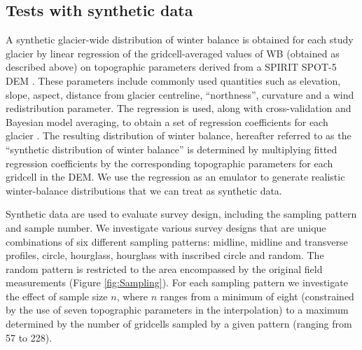 \documentclass[twocolumn,letterpaper]{igs}
\begin{document}
\subsection{Tests with synthetic data}

A synthetic glacier-wide distribution of winter balance is obtained for each study glacier by linear regression of the gridcell-averaged values of WB (obtained as described above) on topographic parameters derived from a SPIRIT SPOT-5 DEM \citep{Korona2009}. These parameters include commonly used quantities \citep[e.g.][]{McGrath2015} such as elevation, slope, aspect, distance from glacier centreline, ``northness'', curvature and a wind redistribution parameter. The regression is used, along with cross-validation and Bayesian model averaging, to obtain a set of regression coefficients for each glacier  \citep{Pulwicki2017}. The resulting distribution of winter balance, hereafter referred to as the ``synthetic distribution of winter balance'' is determined by multiplying fitted regression coefficients by the corresponding topographic parameters for each gridcell in the DEM. We use the regression as an emulator to generate realistic winter-balance distributions that we can treat as synthetic data. 

Synthetic data are used to evaluate survey design, including the sampling pattern and sample number. 
We investigate various survey designs that are unique combinations of six different sampling patterns: midline, midline and transverse profiles, circle, hourglass, hourglass with inscribed circle and random. The random pattern is restricted to the area encompassed by the original field measurements (Figure \ref{fig:Sampling}). 
For each sampling pattern we investigate the effect of sample size $n$, where $n$ ranges from a minimum of eight (constrained by the use of seven topographic parameters in the interpolation) to a maximum determined by the number of gridcells sampled by a given pattern (ranging from 57 to 228). 
\end{document}
